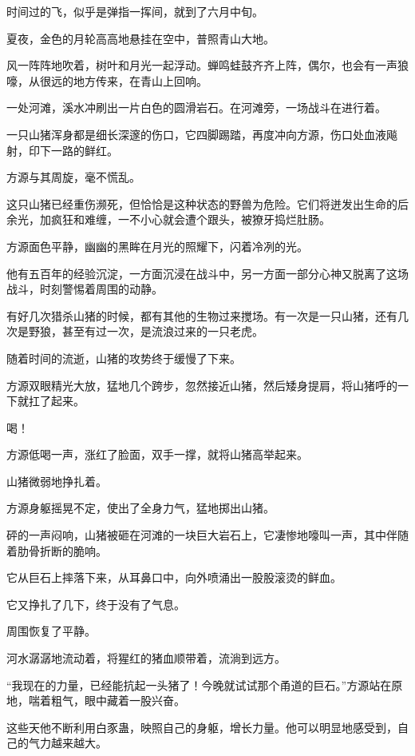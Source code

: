 
\begin{this_body}

时间过的飞，似乎是弹指一挥间，就到了六月中旬。

夏夜，金色的月轮高高地悬挂在空中，普照青山大地。

风一阵阵地吹着，树叶和月光一起浮动。蝉鸣蛙鼓齐齐上阵，偶尔，也会有一声狼嚎，从很远的地方传来，在青山上回响。

一处河滩，溪水冲刷出一片白色的圆滑岩石。在河滩旁，一场战斗在进行着。

一只山猪浑身都是细长深邃的伤口，它四脚踢踏，再度冲向方源，伤口处血液飚射，印下一路的鲜红。

方源与其周旋，毫不慌乱。

这只山猪已经重伤濒死，但恰恰是这种状态的野兽为危险。它们将迸发出生命的后余光，加疯狂和难缠，一不小心就会遭个跟头，被獠牙捣烂肚肠。

方源面色平静，幽幽的黑眸在月光的照耀下，闪着冷冽的光。

他有五百年的经验沉淀，一方面沉浸在战斗中，另一方面一部分心神又脱离了这场战斗，时刻警惕着周围的动静。

有好几次猎杀山猪的时候，都有其他的生物过来搅场。有一次是一只山猪，还有几次是野狼，甚至有过一次，是流浪过来的一只老虎。

随着时间的流逝，山猪的攻势终于缓慢了下来。

方源双眼精光大放，猛地几个跨步，忽然接近山猪，然后矮身提肩，将山猪呼的一下就扛了起来。

喝！

方源低喝一声，涨红了脸面，双手一撑，就将山猪高举起来。

山猪微弱地挣扎着。

方源身躯摇晃不定，使出了全身力气，猛地掷出山猪。

砰的一声闷响，山猪被砸在河滩的一块巨大岩石上，它凄惨地嚎叫一声，其中伴随着肋骨折断的脆响。

它从巨石上摔落下来，从耳鼻口中，向外喷涌出一股股滚烫的鲜血。

它又挣扎了几下，终于没有了气息。

周围恢复了平静。

河水潺潺地流动着，将猩红的猪血顺带着，流淌到远方。

“我现在的力量，已经能抗起一头猪了！今晚就试试那个甬道的巨石。”方源站在原地，喘着粗气，眼中藏着一股兴奋。

这些天他不断利用白豕蛊，映照自己的身躯，增长力量。他可以明显地感受到，自己的气力越来越大。


\end{this_body}
